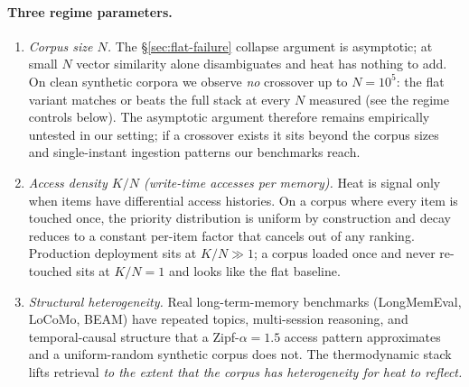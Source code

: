 \documentclass[11pt]{article}
\begin{document}
\paragraph{Three regime parameters.}
\begin{enumerate}
\item \emph{Corpus size $N$.}  The \S\ref{sec:flat-failure} collapse
  argument is asymptotic; at small $N$ vector similarity alone
  disambiguates and heat has nothing to add.  On clean synthetic
  corpora we observe \emph{no} crossover up to $N = 10^5$: the flat
  variant matches or beats the full stack at every $N$ measured
  (see the regime controls below).  The asymptotic argument
  therefore remains empirically untested in our setting; if a
  crossover exists it sits beyond the corpus sizes and
  single-instant ingestion patterns our benchmarks reach.
\item \emph{Access density $K/N$ (write-time accesses per memory).}
  Heat is signal only when items have differential access histories.
  On a corpus where every item is touched once, the priority
  distribution is uniform by construction and decay reduces to a
  constant per-item factor that cancels out of any ranking.
  Production deployment sits at $K/N \gg 1$; a corpus loaded once
  and never re-touched sits at $K/N = 1$ and looks like the flat
  baseline.
\item \emph{Structural heterogeneity.}  Real long-term-memory
  benchmarks (LongMemEval, LoCoMo, BEAM) have repeated topics,
  multi-session reasoning, and temporal-causal structure that a
  Zipf-$\alpha{=}1.5$ access pattern approximates and a
  uniform-random synthetic corpus does not.  The thermodynamic stack
  lifts retrieval \emph{to the extent that the corpus has
  heterogeneity for heat to reflect.}
\end{enumerate}
\end{document}

